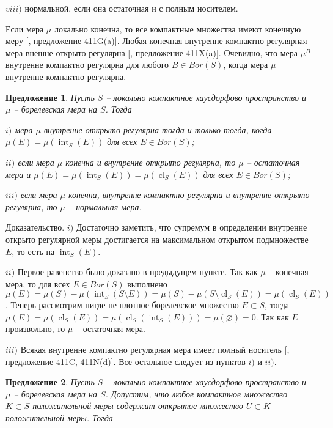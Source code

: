 \documentclass[12pt]{article}
\numberwithin{equation}{subsection}
\theoremstyle{plain}
\newtheorem{proposition}{Предложение}
\newenvironment{proof}{Доказательство.}{}
\begin{document}
\begin{fulltext}
    $viii)$ нормальной, если она остаточная и с полным носителем.

    Если мера $\mu$ локально конечна, то все компактные множества имеют конечную меру [\cite{FremMeasTh4.1}, предложение 411G(a)]. Любая конечная внутренне компактно регулярная мера внешне открыто регулярна [\cite{FremMeasTh4.1}, предложение 411X(a)]. Очевидно, что мера $\mu^B$ внутренне компактно регулярна для любого $B\in Bor(S)$, когда мера $\mu$ внутренне компактно регулярна.

    \begin{proposition}\label{InnerOpenRegMeasCharac} Пусть $S$ -- локально компактное хаусдорфово пространство и $\mu$ -- борелевская мера на $S$. Тогда

        $i)$ мера $\mu$ внутренне открыто регулярна тогда и только тогда, когда $\mu(E)=\mu(\operatorname{int}_S(E))$ для всех $E\in Bor(S)$;

        $ii)$ если мера $\mu$ конечна и внутренне открыто регулярна, то $\mu$ -- остаточная мера и $\mu(E)=\mu(\operatorname{int}_S(E))=\mu(\operatorname{cl}_S(E))$ для всех $E\in Bor(S)$;

        $iii)$ если мера $\mu$ конечна, внутренне компактно регулярна и внутренне открыто регулярна, то $\mu$ -- нормальная мера.
    \end{proposition}
    \begin{proof} $i)$ Достаточно заметить, что супремум в определении внутренне открыто регулярной меры достигается на максимальном открытом подмножестве $E$, то есть на $\operatorname{int}_S(E)$.

        $ii)$ Первое равенство было доказано в предыдущем пункте. Так как $\mu$ -- конечная мера, то для всех $E\in Bor(S)$ выполнено $\mu(E)=\mu(S)-\mu(\operatorname{int}_S(S\setminus E))=\mu(S)-\mu(S\setminus \operatorname{cl}_S(E))=\mu(\operatorname{cl}_S(E))$. Теперь рассмотрим нигде не плотное борелевское множество $E\subset S$, тогда $\mu(E)=\mu(\operatorname{cl}_S(E))=\mu(\operatorname{cl}_S(\operatorname{int}_S(E)))=\mu(\varnothing)=0$. Так как $E$ произвольно, то $\mu$ -- остаточная мера.

        $iii)$ Всякая внутренне компактно регулярная мера имеет полный носитель [\cite{FremMeasTh4.1}, предложение 411C, 411N(d)]. Все остальное следует из пунктов $i)$ и $ii)$.
    \end{proof}

    \begin{proposition}\label{NormalMeasCharac} Пусть $S$ -- локально компактное хаусдорфово пространство и $\mu$ -- борелевская мера на $S$. Допустим, что любое компактное множество $K\subset S$ положительной меры содержит открытое множество $U\subset K$ положительной меры. Тогда


\end{proposition}
\end{fulltext}
\end{document}
